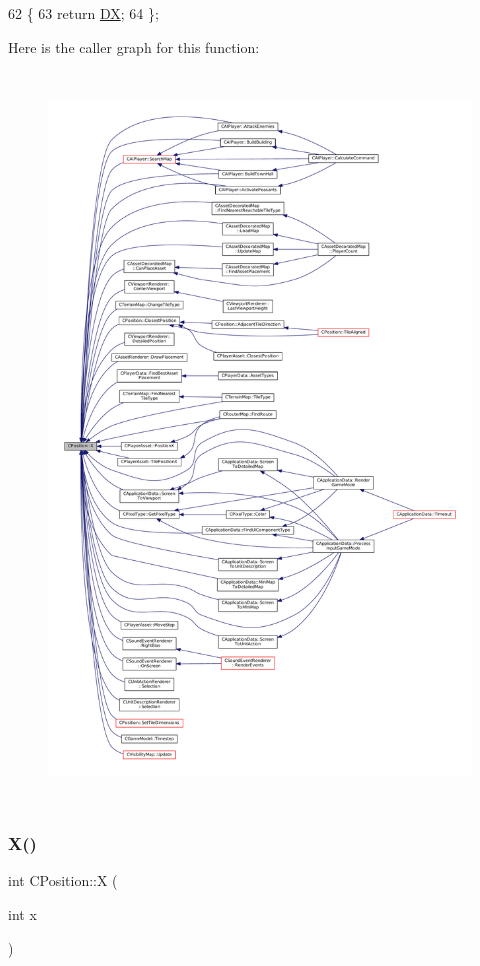 \begin{DoxyCode}
62                      \{
63             \textcolor{keywordflow}{return} \hyperlink{classCPosition_a28445f9b872169715919074d82044eda}{DX};  
64         \};
\end{DoxyCode}
Here is the caller graph for this function\+:\nopagebreak
\begin{figure}[H]
\begin{center}
\leavevmode
\includegraphics[height=550pt]{classCPosition_a9a6b94d3b91df1492d166d9964c865fc_icgraph}
\end{center}
\end{figure}
\hypertarget{classCPosition_abcbbd0f2a24118ff32560150c967b1da}{}\label{classCPosition_abcbbd0f2a24118ff32560150c967b1da} 
\subsubsection{\texorpdfstring{X()}{X()}\hspace{0.1cm}{\footnotesize\ttfamily [2/2]}}
{\footnotesize\ttfamily int C\+Position\+::X (\begin{DoxyParamCaption}\item[{int}]{x }\end{DoxyParamCaption})\hspace{0.3cm}{\ttfamily [inline]}}



